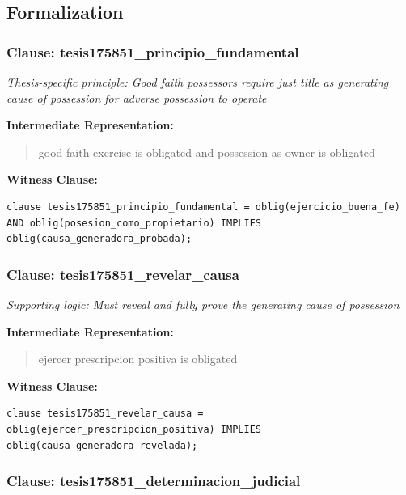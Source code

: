 \documentclass[11pt,a4paper]{article}
\begin{document}
\subsection{Formalization}

\subsubsection{Clause: tesis175851\_principio\_fundamental}

\textit{Thesis-specific principle: Good faith possessors require just title as generating cause of possession for adverse possession to operate}

\textbf{Intermediate Representation:}

\begin{quote}
good faith exercise is obligated and possession as owner is obligated
\end{quote}

\textbf{Witness Clause:}

\begin{lstlisting}[style=witnessstyle, language=Witness]
clause tesis175851_principio_fundamental = oblig(ejercicio_buena_fe) AND oblig(posesion_como_propietario) IMPLIES oblig(causa_generadora_probada);
\end{lstlisting}

\subsubsection{Clause: tesis175851\_revelar\_causa}

\textit{Supporting logic: Must reveal and fully prove the generating cause of possession}

\textbf{Intermediate Representation:}

\begin{quote}
ejercer prescripcion positiva is obligated
\end{quote}

\textbf{Witness Clause:}

\begin{lstlisting}[style=witnessstyle, language=Witness]
clause tesis175851_revelar_causa = oblig(ejercer_prescripcion_positiva) IMPLIES oblig(causa_generadora_revelada);
\end{lstlisting}

\subsubsection{Clause: tesis175851\_determinacion\_judicial}
\end{document}
